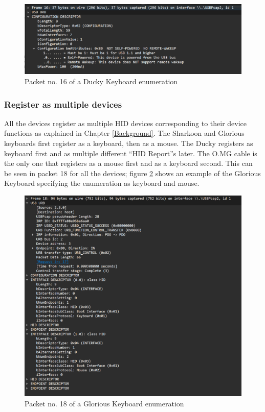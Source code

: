\begin{figure}[H]
    \centering
    \includegraphics[width=0.75\linewidth]{visuals/no-remote-wakeup-100mA.png}
    \caption{Packet no. 16 of a Ducky Keyboard enumeration}
    \label{fig:packet16Ducky}
\end{figure}


\subsubsection{Register as multiple devices}

All the devices register as multiple HID devices corresponding to their device functions as explained in Chapter \ref{Background}. The Sharkoon and Glorious keyboards first register as a keyboard, then as a mouse. The Ducky registers as keyboard first and as multiple different ``HID Report''s later. The O.MG cable is the only one that registers as a mouse first and as a keyboard second. This can be seen in packet 18 for all the devices; figure \ref{fig:packet18Glorious} shows an example of the Glorious Keyboard specifying the enumeration as keyboard and mouse. 

\begin{figure}[H]
    \centering
    \includegraphics[width=0.75\linewidth]{visuals/packet18glorious.png}
    \caption{Packet no. 18 of a Glorious Keyboard enumeration}
    \label{fig:packet18Glorious}
\end{figure}

